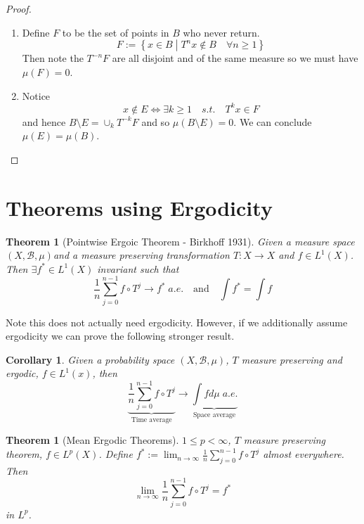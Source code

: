 \documentclass[11pt]{article}
\newcommand{\defeq}{:=}
\newcommand{\msrspc}{\ensuremath{(X,\mathcal{B},\mu)}}
\newcommand{\relmiddle}[1]{\mathrel{}\middle#1\mathrel{}}
\newcommand{\rmv}{\relmiddle|}
\newtheorem{theorem}[prop]{Theorem}
\newtheorem{cor}[prop]{Corollary}
\begin{document}
\begin{proof}
\begin{enumerate}
	\item Define $F$ to be the set of points in $B$ who never return.
		\[
			F\defeq \left\{ x\in B \rmv T^nx\not\in B \quad \forall n\geq 1\right\}
		\]
		Then note the $T^{-n}F$ are all disjoint and of the same measure so we must have $\mu(F) = 0$.
	\item Notice
		\[
			x\not \in E \iff \exists k \geq 1 \quad s.t. \quad T^kx \in F
		\]
		and hence $B\setminus E = \cup_k T^{-k}F$ and so $\mu(B \setminus E) = 0$.
		We can conclude $\mu(E) = \mu(B)$.
\end{enumerate}
\end{proof}

\section{Theorems using Ergodicity}
\begin{theorem}[Pointwise Ergoic Theorem - Birkhoff 1931]
	Given a measure space \msrspc and a measure preserving transformation $T:X \to X$ and $f\in L^1(X)$. Then $\exists f^*\in L^1(X)$ invariant such that
	$$\frac{1}{n}\sum_{j=0}^{n-1}f\circ T^j \to f^* \; a.e.\quad \text{and} \quad \int f^* = \int f$$
\end{theorem}
Note this does not actually need ergodicity. However, if we additionally assume ergodicity we can prove the following stronger result.
\begin{cor}
Given a probability space \msrspc, $T$ measure preserving and ergodic, $f\in L^1(x)$, then
$$\underbrace{\frac{1}{n}\sum_{j=0}^{n-1}f\circ T^j }_{\text{Time average}}\to \underbrace{\int f d\mu \; a.e.}_{\text{Space average}}$$
\end{cor}
\begin{theorem}[Mean Ergodic Theorems]
	$1\leq p < \infty$, $T$ measure preserving theorem, $f\in L^p(X)$. Define $f^*\defeq \lim_{n\to\infty} \frac{1}{n}\sum_{j=0}^{n-1}f\circ T^j$ almost everywhere. Then
	$$\lim_{n\to\infty}\frac{1}{n}\sum_{j=0}^{n-1}f\circ T^j = f^*$$
	in $L^p$.
\end{theorem}
\end{document}
